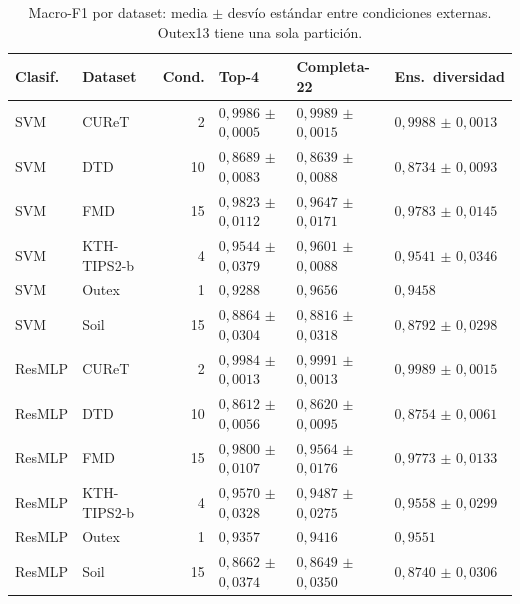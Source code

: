 \begin{table}[H]
\centering\fontsize{8}{10}\selectfont\setlength{\tabcolsep}{3.0pt}
\caption{Macro-F1 por dataset: media $\pm$ desvío estándar entre condiciones externas. Outex13 tiene una sola partición.}
\label{tab:sel-spread}
\begin{tabular}{@{}llrlll@{}}
\toprule
Clasif. & Dataset & Cond. & Top-4 & Completa-22 & Ens.\ diversidad \\
\midrule
SVM & CUReT & 2 & $0{,}9986$ $\pm$ $0{,}0005$ & $0{,}9989$ $\pm$ $0{,}0015$ & $0{,}9988$ $\pm$ $0{,}0013$ \\
SVM & DTD & 10 & $0{,}8689$ $\pm$ $0{,}0083$ & $0{,}8639$ $\pm$ $0{,}0088$ & $0{,}8734$ $\pm$ $0{,}0093$ \\
SVM & FMD & 15 & $0{,}9823$ $\pm$ $0{,}0112$ & $0{,}9647$ $\pm$ $0{,}0171$ & $0{,}9783$ $\pm$ $0{,}0145$ \\
SVM & KTH-TIPS2-b & 4 & $0{,}9544$ $\pm$ $0{,}0379$ & $0{,}9601$ $\pm$ $0{,}0088$ & $0{,}9541$ $\pm$ $0{,}0346$ \\
SVM & Outex & 1 & $0{,}9288$ & $0{,}9656$ & $0{,}9458$ \\
SVM & Soil & 15 & $0{,}8864$ $\pm$ $0{,}0304$ & $0{,}8816$ $\pm$ $0{,}0318$ & $0{,}8792$ $\pm$ $0{,}0298$ \\
ResMLP & CUReT & 2 & $0{,}9984$ $\pm$ $0{,}0013$ & $0{,}9991$ $\pm$ $0{,}0013$ & $0{,}9989$ $\pm$ $0{,}0015$ \\
ResMLP & DTD & 10 & $0{,}8612$ $\pm$ $0{,}0056$ & $0{,}8620$ $\pm$ $0{,}0095$ & $0{,}8754$ $\pm$ $0{,}0061$ \\
ResMLP & FMD & 15 & $0{,}9800$ $\pm$ $0{,}0107$ & $0{,}9564$ $\pm$ $0{,}0176$ & $0{,}9773$ $\pm$ $0{,}0133$ \\
ResMLP & KTH-TIPS2-b & 4 & $0{,}9570$ $\pm$ $0{,}0328$ & $0{,}9487$ $\pm$ $0{,}0275$ & $0{,}9558$ $\pm$ $0{,}0299$ \\
ResMLP & Outex & 1 & $0{,}9357$ & $0{,}9416$ & $0{,}9551$ \\
ResMLP & Soil & 15 & $0{,}8662$ $\pm$ $0{,}0374$ & $0{,}8649$ $\pm$ $0{,}0350$ & $0{,}8740$ $\pm$ $0{,}0306$ \\
\bottomrule
\end{tabular}
\end{table}
